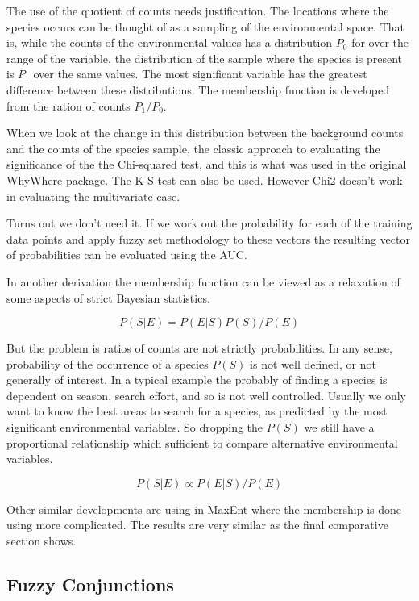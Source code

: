 \documentclass{article}
\newcommand{\pkg}[1]{{\fontseries{b}\selectfont #1}}
\begin{document}
The use of the quotient of counts needs justification.  The locations where the species occurs can be thought of as a sampling of the environmental space.  That is, while the counts of the environmental values has a distribution $P_0$ for over the range of the variable, the distribution of the sample where the species is present is $P_1$ over the same values.  The most significant variable has the greatest difference between these distributions.  The membership function is developed from the ration of counts   $P_1/P_0$. 

When we look at the change in this distribution between the background counts and the counts of the species sample, the classic approach to evaluating the significance of the  the Chi-squared test, and this is what was used in the original \pkg{WhyWhere} package. The K-S test can also be used. However Chi2 doesn't work in evaluating the multivariate case.  

Turns out we don't need it.  If we work out the probability for each of the training data points and apply fuzzy set methodology to these vectors the resulting vector of probabilities can be evaluated using the AUC.  

In another derivation the membership function can be viewed as a relaxation of some aspects of strict Bayesian statistics.  

\begin{equation}
P(S|E)=P(E|S)P(S)/P(E)
\end{equation}

But the problem is ratios of counts are not strictly probabilities.  In any sense, probability of the occurrence of a species $P(S)$ is not well defined, or not generally of interest.  In a typical example the probably of finding a species is dependent on season, search effort, and so is not well controlled.  Usually we only want to know the best areas to search for a species, as predicted by the most significant environmental variables.  So dropping the $P(S)$ we still have a proportional relationship which sufficient to compare alternative environmental variables.  

\begin{equation}
P(S|E)\propto P(E|S)/P(E)
\end{equation}

Other similar developments are using in MaxEnt where the membership is done using more complicated.  The results are very similar as the final comparative section shows.

\subsection{Fuzzy Conjunctions}
\end{document}
